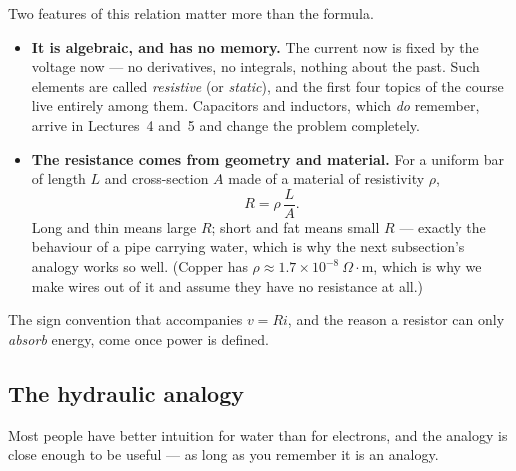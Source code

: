 \documentclass[11pt,a4paper]{article}
\begin{document}
Two features of this relation matter more than the formula.

\begin{itemize}
  \item \textbf{It is algebraic, and has no memory.} The current now is fixed by the
        voltage now --- no derivatives, no integrals, nothing about the past. Such
        elements are called \emph{resistive} (or \emph{static}), and the first four topics
        of the course live entirely among them. Capacitors and inductors, which \emph{do}
        remember, arrive in Lectures~4 and~5 and change the problem completely.
  \item \textbf{The resistance comes from geometry and material.} For a uniform bar of
        length $L$ and cross-section $A$ made of a material of resistivity $\rho$,
        \[
          R = \rho\,\frac{L}{A} .
        \]
        Long and thin means large $R$; short and fat means small $R$ --- exactly the
        behaviour of a pipe carrying water, which is why the next subsection's analogy
        works so well. (Copper has
        $\rho \approx 1.7\times10^{-8}\ \Omega\cdot\mathrm{m}$, which is why we make wires
        out of it and assume they have no resistance at all.)
\end{itemize}

The sign convention that accompanies $v = Ri$, and the reason a resistor can only
\emph{absorb} energy, come once power is defined.

\subsection{The hydraulic analogy}

Most people have better intuition for water than for electrons, and the analogy is close
enough to be useful --- as long as you remember it is an analogy.
\end{document}
